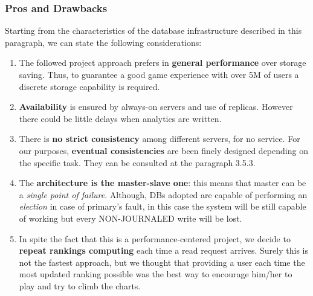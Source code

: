 \subsubsection{Pros and Drawbacks}
Starting from the characteristics of the database infrastructure described in this paragraph, we can state the following considerations:
\begin{enumerate}
	\item The followed project approach prefers in \textbf{general performance} over storage saving. Thus, to guarantee a good game experience with over 5M of users a discrete storage capability is required.
	\item \textbf{Availability} is ensured by always-on servers and use of replicas. However there could be little delays when analytics are written. 
	\item There is \textbf{no strict consistency} among different servers, for no service. For our purposes, \textbf{eventual consistencies} are been finely designed depending on the specific task. They can be consulted at the paragraph 3.5.3.
	\item The \textbf{architecture is the master-slave one}: this means that master can be a \textit{single point of failure}. Although, DBs adopted are capable of performing an \textit{election} in case of primary’s fault, in this case the system will be still capable of working but every NON-JOURNALED write will be lost.  
	\item In spite the fact that this is a performance-centered project, we decide to \textbf{repeat rankings computing} each time a read request arrives. Surely this is not the fastest approach, but we thought that providing a user each time the most updated ranking possible was the best way to encourage him/her to play and try to climb the charts.
\end{enumerate}

